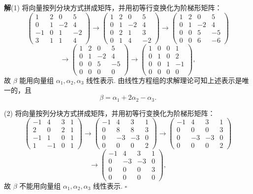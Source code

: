 \documentclass[UTF8, 12pt, fontset=fandol, oneside]{ctexart}
\begin{document}
\noindent\textbf{解}\quad (1) 将向量按列分块方式拼成矩阵，并用初等行变换化为阶梯形矩阵：
\[
\left(
\begin{array}{ccc|c}
1 & 2 & 0 & 5\\
0 & 1 & -2 & 4\\
-1 & 0 & 1 & -2\\
3 & 1 & 1 & 4
\end{array}
\right)
\to
\left(
\begin{array}{ccc|c}
1 & 2 & 0 & 5\\
0 & 1 & -2 & 4\\
0 & 2 & 1 & 3\\
0 & 1 & 4 & -2
\end{array}
\right)
\to
\left(
\begin{array}{ccc|c}
1 & 2 & 0 & 5\\
0 & 1 & -2 & 4\\
0 & 0 & 5 & -5\\
0 & 0 & 6 & -6
\end{array}
\right)
\]
\[
\to
\left(
\begin{array}{ccc|c}
1 & 2 & 0 & 5\\
0 & 1 & -2 & 4\\
0 & 0 & 5 & -5\\
0 & 0 & 0 & 0
\end{array}
\right)
\to
\left(
\begin{array}{ccc|c}
1 & 0 & 0 & 1\\
0 & 1 & 0 & 2\\
0 & 0 & 1 & -1\\
0 & 0 & 0 & 0
\end{array}
\right),
\]
故 $\beta$ 能用向量组 $\alpha_1,\alpha_2,\alpha_3$ 线性表示. 由线性方程组的求解理论可知上述表示是唯一的，且
\[
\beta=\alpha_1+2\alpha_2-\alpha_3.
\]

(2) 将向量按列分块方式拼成矩阵，并用初等行变换化为阶梯形矩阵：
\[
\left(
\begin{array}{ccc|c}
-1 & 4 & 3 & 1\\
2 & 0 & 2 & 1\\
-1 & 1 & 0 & 1\\
1 & -1 & 0 & 1
\end{array}
\right)
\to
\left(
\begin{array}{ccc|c}
-1 & 4 & 3 & 1\\
0 & 8 & 8 & 3\\
0 & -3 & -3 & 0\\
0 & 0 & 0 & 2
\end{array}
\right)
\to
\left(
\begin{array}{ccc|c}
-1 & 4 & 3 & 1\\
0 & 0 & 0 & 3\\
0 & -3 & -3 & 0\\
0 & 0 & 0 & 2
\end{array}
\right)
\]
\[
\to
\left(
\begin{array}{ccc|c}
-1 & 4 & 3 & 1\\
0 & -3 & -3 & 0\\
0 & 0 & 0 & 3\\
0 & 0 & 0 & 0
\end{array}
\right),
\]
故 $\beta$ 不能用向量组 $\alpha_1,\alpha_2,\alpha_3$ 线性表示. $\square$
\end{document}
